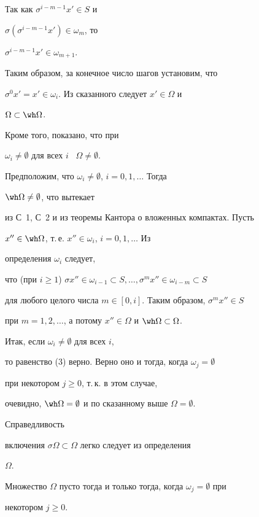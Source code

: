 Так как $\sigma^{i-m-1}x'\in S$ и 


$\sigma(\sigma^{i-m-1}x')\in\omega_m$, то 


$\sigma^{i-m-1}x'\in\omega_{m+1}$. 


Таким образом, за конечное число шагов установим, что 


$\sigma^0x'=x'\in\omega_i$. Из сказанного следует $x'\in\Omega$ и 


$\Omega\subset\wh\Omega$. 


Кроме того, показано, что при


$\omega_i\ne\emptyset$ для всех $i$ \ $\Omega\ne\emptyset$. 


 


Предположим, что $\omega_i\ne\emptyset$, $i=0,1,\dotsc$ Тогда 


$\wh\Omega\ne\emptyset$, что вытекает 


из С~1, С~2 и из теоремы Кантора о вложенных компактах. Пусть 


$x''\in\wh\Omega$, т.\,е. $x''\in\omega_i$, $i=0,1,\dotsc$ Из 


определения $\omega_i$ следует, 


что (при $i\ge1$) $\sigma x''\in\omega_{i-1}\subset S,\dotsc, \sigma^m 


x''\in\omega_{i-m}\subset S$ 


для любого целого числа $m\in[0,i]$. Таким образом, $\sigma^m x''\in S$ 


при $m=1,2,\dotsc$, а потому $x''\in\Omega$ и $\wh\Omega\subset\Omega$. 


Итак, если $\omega_i\ne\emptyset$ для всех $i$,


то равенство (3) верно. Верно оно и тогда, когда $\omega_j=\emptyset$


при некотором $j\ge0$, т.\,к. в этом случае, 


очевидно, $\wh\Omega=\emptyset$ и по сказанному выше $\Omega=\emptyset$. 


Справедливость 


включения $\sigma\Omega\subset\Omega$ легко следует из определения 


$\Omega$. 


 


\begin{pty} 


Множество $\Omega$ пусто тогда и только тогда, когда $\omega_j=\emptyset$ при 


некотором $j\ge0$. 


\end{pty} 


